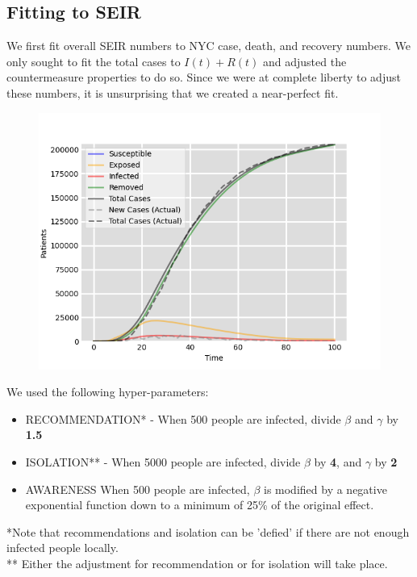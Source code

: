\documentclass[12pt, a4, epsf] {article}
\theoremstyle{plain}
\theoremstyle{definition}
\begin{document}
\subsection{Fitting to SEIR}
We first fit overall SEIR numbers to NYC case, death, and recovery numbers. We only sought to fit the total cases to $I(t) + R(t)$ and adjusted the countermeasure properties to do so. Since we were at complete liberty to adjust these numbers, it is unsurprising that we created a near-perfect fit.\\
\begin{figure}[htbp]
\includegraphics[width = 1.0\textwidth]{Scratch_Visuals/SEIR_Curve_NYC_3.png}
\end{figure}
\FloatBarrier
We used the following hyper-parameters:\\
\begin{itemize}
    \item RECOMMENDATION* - When 500 people are infected, divide $\beta$ and $\gamma$ by \textbf{1.5}
    \item ISOLATION** - When 5000 people are infected, divide $\beta$ by \textbf{4}, and $\gamma$ by \textbf{2}
    \item AWARENESS When 500 people are infected, $\beta$ is modified by a negative exponential function down to a minimum of 25\% of the original effect.
\end{itemize}
*Note that recommendations and isolation can be 'defied' if there are not enough infected people locally.\\
** Either the adjustment for recommendation or for isolation will take place.\\
\end{document}
